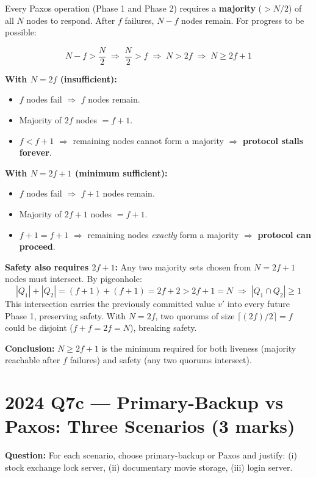 \documentclass[12pt,a4paper]{article}
\begin{document}
Every Paxos operation (Phase 1 and Phase 2) requires a \textbf{majority} ($> N/2$) of all $N$ nodes to respond. After $f$ failures, $N - f$ nodes remain. For progress to be possible:

\[
  N - f > \frac{N}{2}
  \;\Longrightarrow\;
  \frac{N}{2} > f
  \;\Longrightarrow\;
  N > 2f
  \;\Longrightarrow\;
  \boxed{N \geq 2f+1}
\]

\textbf{With $N = 2f$ (insufficient):}
\begin{itemize}[noitemsep]
  \item $f$ nodes fail $\Rightarrow$ $f$ nodes remain.
  \item Majority of $2f$ nodes $= f+1$.
  \item $f < f+1$ $\Rightarrow$ remaining nodes cannot form a majority $\Rightarrow$ \textbf{protocol stalls forever}.
\end{itemize}

\textbf{With $N = 2f+1$ (minimum sufficient):}
\begin{itemize}[noitemsep]
  \item $f$ nodes fail $\Rightarrow$ $f+1$ nodes remain.
  \item Majority of $2f+1$ nodes $= f+1$.
  \item $f+1 = f+1$ $\Rightarrow$ remaining nodes \emph{exactly} form a majority $\Rightarrow$ \textbf{protocol can proceed}.
\end{itemize}

\textbf{Safety also requires $2f+1$:} Any two majority sets chosen from $N = 2f+1$ nodes must intersect. By pigeonhole:
\[
  |Q_1| + |Q_2| = (f+1) + (f+1) = 2f+2 > 2f+1 = N
  \;\Rightarrow\; |Q_1 \cap Q_2| \geq 1
\]
This intersection carries the previously committed value $v'$ into every future Phase 1, preserving safety. With $N = 2f$, two quorums of size $\lceil (2f)/2 \rceil = f$ could be disjoint ($f + f = 2f = N$), breaking safety.

\textbf{Conclusion:} $N \geq 2f+1$ is the minimum required for both liveness (majority reachable after $f$ failures) and safety (any two quorums intersect).

\section{2024 Q7c --- Primary-Backup vs Paxos: Three Scenarios (3 marks)}

\textbf{Question:} For each scenario, choose primary-backup or Paxos and justify: (i) stock exchange lock server, (ii) documentary movie storage, (iii) login server.
\end{document}

